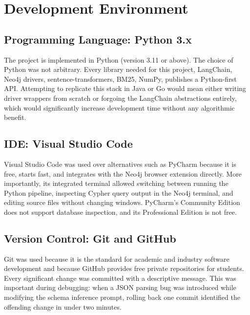 

\section{Development Environment}

\subsection{Programming Language: Python 3.x}

The project is implemented in Python (version 3.11 or above). The choice of Python was
not arbitrary. Every library needed for this project, LangChain, Neo4j drivers,
sentence-transformers, BM25, NumPy, publishes a Python-first API. Attempting
to replicate this stack in Java or Go would mean either writing driver wrappers
from scratch or forgoing the LangChain abstractions entirely, which would
significantly increase development time without any algorithmic benefit.

\subsection{IDE: Visual Studio Code}

Visual Studio Code was used over alternatives such as PyCharm because it is
free, starts fast, and integrates with the Neo4j browser extension directly.
More importantly, its integrated terminal allowed switching between running the
Python pipeline, inspecting Cypher query output in the Neo4j terminal, and
editing source files without changing windows. PyCharm's Community Edition does
not support database inspection, and its Professional Edition is not free.

\subsection{Version Control: Git and GitHub}

Git was used because it is the standard for academic and industry software
development and because GitHub provides free private repositories for students.
Every significant change was committed with a descriptive message. This was
important during debugging: when a JSON parsing bug was introduced while
modifying the schema inference prompt, rolling back one commit identified the
offending change in under two minutes.

